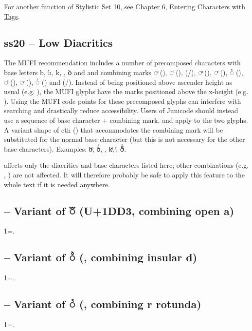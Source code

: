 \noindent For another function of Stylistic Set 10, see \hyperlink{tagchapter}{Chapter 6, Entering Characters with Tags}.

\subsection{ss20 -- Low Diacritics}
The MUFI recommendation includes a number of precomposed characters with base letters b, h, k, {\th}, ꝺ and {\dh}
and combining marks ◌ͣ (), ◌ͤ (), 
(\slash{}), ◌ͦ (), ◌ͬ (), ◌ᷢ (),
◌ͭ (), ◌ͮ (), ◌ᷦ () and 
(/). Instead of being positioned above ascender height as usual (e.g.
), the MUFI glyphs have the marks positioned above the x-height
(e.g. ).
Using the MUFI code points for these precomposed glyphs can interfere with searching
and drastically reduce accessibility. Users of Junicode should instead use a sequence of base character + combining
mark, and apply  to the two glyphs. A variant shape of eth (\textex{{\dh}})
that accommodates the combining mark will be substituted for the normal base character (but this is not necessary for
the other base characters). Examples:
{bͦ, ꝺᷦ, , kͤ, {\th}ͭ, ðᷢ}.

 affects only the diacritics and base characters listed here; other combinations (e.g.
, ) are not affected. It will therefore probably be safe
to apply this feature to the whole text if it is needed anywhere.

\subsection{ -- Variant of ◌ᷓ (U+1DD3, combining open a)}
1=.

\subsection{ -- Variant of ◌ᷘ (, combining insular
d)}
1=.

\subsection{ -- Variant of ◌ᷣ (, combining r rotunda)}
1=.

